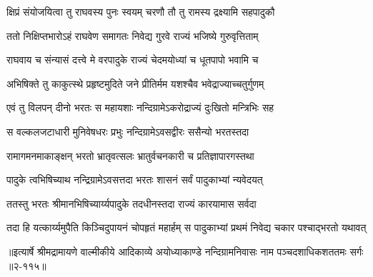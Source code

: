 \twolineshloka
{क्षिप्रं संयोजयित्वा तु राघवस्य पुनः स्वयम्}
{चरणौ तौ तु रामस्य द्रक्ष्यामि सहपादुकौ} %

\twolineshloka
{ततो निक्षिप्तभारोऽहं राघवेण समागतः}
{निवेद्य गुरवे राज्यं भजिष्ये गुरुवृत्तिताम्} %

\twolineshloka
{राघवाय च संन्यासं दत्त्वे मे वरपादुके}
{राज्यं चेदमयोध्यां च धूतपापो भवामि च} %

\twolineshloka
{अभिषिक्ते तु काकुत्स्थे प्रहृष्टमुदिते जने}
{प्रीतिर्मम यशश्चैव भवेद्राज्याच्चतुर्गुणम्} %

\twolineshloka
{एवं तु विलपन् दीनो भरतः स महायशाः}
{नन्दिग्रामेऽकरोद्राज्यं दुःखितो मन्त्रिभिः सह} %

\twolineshloka
{स वल्कलजटाधारी मुनिवेषधरः प्रभुः}
{नन्दिग्रामेऽवसद्वीरः ससैन्यो भरतस्तदा} %

\twolineshloka
{रामागमनमाकाङ्क्षन् भरतो भ्रातृवत्सलः}
{भ्रातुर्वचनकारी च प्रतिज्ञापारगस्तथा} %

\twolineshloka
{पादुके त्वभिषिच्याथ नन्द्रिग्रामेऽवसत्तदा}
{भरतः शासनं सर्वं पादुकाभ्यां न्यवेदयत्} %

\twolineshloka
{ततस्तु भरतः श्रीमानभिषिच्यार्य्यपादुके}
{तदधीनस्तदा राज्यं कारयामास सर्वदा} %

\twolineshloka
{तदा हि यत्कार्य्यमुपैति किञ्चिदुपायनं चोपहृतं महार्हम्}
{स पादुकाभ्यां प्रथमं निवेद्य चकार पश्चाद्भरतो यथावत्} %


॥इत्यार्षे श्रीमद्रामायणे वाल्मीकीये आदिकाव्ये अयोध्याकाण्डे नन्दिग्रामनिवासः नाम पञ्चदशाधिकशततमः सर्गः ॥२-११५॥

